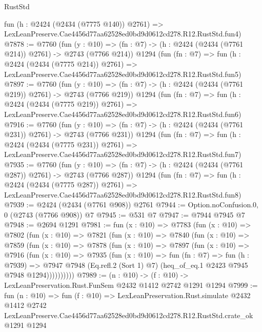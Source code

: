 \begin{lexlean}{RustStd}
\begin{coremodule}
    fun (h : @2424 (@2434 (@7775 @140)) @2761) =>
    LexLeanPreserve.Cae4456d77aa62528ed0bd9d0612cd278.R12.RustStd.fun4)
@7878 := @7760
    (fun (y : @10) => (fn : @7) -> (h : @2424 (@2434 (@7761 @214)) @2761) -> @2743 (@7766 @214))
    @1294
    (fun (fn : @7) =>
    fun (h : @2424 (@2434 (@7775 @214)) @2761) =>
    LexLeanPreserve.Cae4456d77aa62528ed0bd9d0612cd278.R12.RustStd.fun5)
@7897 := @7760
    (fun (y : @10) => (fn : @7) -> (h : @2424 (@2434 (@7761 @219)) @2761) -> @2743 (@7766 @219))
    @1294
    (fun (fn : @7) =>
    fun (h : @2424 (@2434 (@7775 @219)) @2761) =>
    LexLeanPreserve.Cae4456d77aa62528ed0bd9d0612cd278.R12.RustStd.fun6)
@7916 := @7760
    (fun (y : @10) => (fn : @7) -> (h : @2424 (@2434 (@7761 @231)) @2761) -> @2743 (@7766 @231))
    @1294
    (fun (fn : @7) =>
    fun (h : @2424 (@2434 (@7775 @231)) @2761) =>
    LexLeanPreserve.Cae4456d77aa62528ed0bd9d0612cd278.R12.RustStd.fun7)
@7935 := @7760
    (fun (y : @10) => (fn : @7) -> (h : @2424 (@2434 (@7761 @287)) @2761) -> @2743 (@7766 @287))
    @1294
    (fun (fn : @7) =>
    fun (h : @2424 (@2434 (@7775 @287)) @2761) =>
    LexLeanPreserve.Cae4456d77aa62528ed0bd9d0612cd278.R12.RustStd.fun8)
@7939 := @2424 (@2434 (@7761 @908)) @2761
@7944 := Option.noConfusion.{0, 0} (@2743 (@7766 @908)) @7
@7945 := @531 @7
@7947 := @7944 @7945 @7
@7948 := @2694 @1291
@7981 := fun (x : @10) =>
  @7783
    (fun (x : @10) =>
    @7802
      (fun (x : @10) =>
      @7821
        (fun (x : @10) =>
        @7840
          (fun (x : @10) =>
          @7859
            (fun (x : @10) =>
            @7878
              (fun (x : @10) =>
              @7897
                (fun (x : @10) =>
                @7916
                  (fun (x : @10) =>
                  @7935
                    (fun (x : @10) =>
                    fun (fn : @7) =>
                    fun (h : @7939) =>
                    @7947
                      @7948
                      (Eq.refl.{2} (Sort 1) @7)
                      (heq_of_eq.{1} @2423 @7945 @7948 @1294))))))))))
@7989 := (n : @10) -> (f : @10) -> LexLeanPreservation.Rust.FunSem @2432 @1412 @2742 @1291 @1294
@7999 := fun (n : @10) =>
  fun (f : @10) =>
  LexLeanPreservation.Rust.simulate
    @2432
    @1412
    @2742
    LexLeanPreserve.Cae4456d77aa62528ed0bd9d0612cd278.R12.RustStd.crate_ok
    @1291
    @1294
\end{coremodule}
\end{lexlean}
